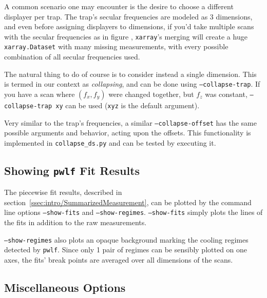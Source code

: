 A common scenario one may encounter is the desire to choose a different displayer per trap. The trap's secular frequencies are modeled as 3 dimensions, and even before assigning displayers to dimensions, if you'd take multiple scans with the secular frequencies as in figure%
, \texttt{xarray}'s merging will create a huge \texttt{xarray.Dataset} with many missing measurements, with every possible combination of all secular frequencies used.

The natural thing to do of course is to consider instead a single dimension. This is termed in our context as \textit{collapsing}, and can be done using \texttt{--collapse-trap}. If you have a scan where $(f_x, f_y)$ were changed together, but $f_z$ was constant, \texttt{--collapse-trap xy} can be used (\texttt{xyz} is the default argument).

Very similar to the trap's frequencies, a similar \texttt{--collapse-offset} has the same possible arguments and behavior, acting upon the offsets. This functionality is implemented in \texttt{collapse\_ds.py} and can be tested by executing it.

\subsection{Showing \texttt{pwlf} Fit Results}

The piecewise fit results, described in section~\ref{ssec:intro/SummarizedMeasurement}, can be plotted by the command line options \texttt{--show-fits} and \texttt{--show-regimes}. \texttt{--show-fits} simply plots the lines of the fits in addition to the raw measurements.

\texttt{--show-regimes} also plots an opaque background marking the cooling regimes detected by \texttt{pwlf}\cite{pwlf}. Since only 1 pair of regimes can be sensibly plotted on one axes, the fits' break points are averaged over all dimensions of the scans.

\subsection{Miscellaneous Options}

